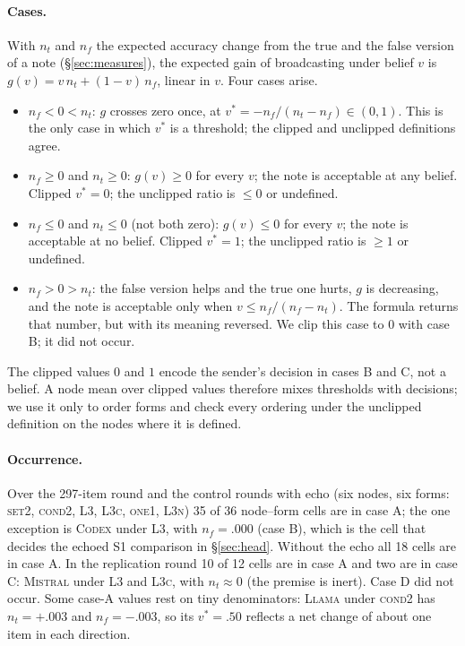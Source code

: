 \documentclass[11pt]{article}
\begin{document}
\paragraph{Cases.} With $n_t$ and $n_f$ the expected accuracy change from the true and the false version of a note (\S\ref{sec:measures}), the expected gain of broadcasting under belief $v$ is $g(v)=v\,n_t+(1-v)\,n_f$, linear in $v$. Four cases arise.
\begin{itemize}\itemsep0pt
\item[A] $n_f<0<n_t$: $g$ crosses zero once, at $v^\ast=-n_f/(n_t-n_f)\in(0,1)$. This is the only case in which $v^\ast$ is a threshold; the clipped and unclipped definitions agree.
\item[B] $n_f\ge0$ and $n_t\ge0$: $g(v)\ge0$ for every $v$; the note is acceptable at any belief. Clipped $v^\ast=0$; the unclipped ratio is $\le0$ or undefined.
\item[C] $n_f\le0$ and $n_t\le0$ (not both zero): $g(v)\le0$ for every $v$; the note is acceptable at no belief. Clipped $v^\ast=1$; the unclipped ratio is $\ge1$ or undefined.
\item[D] $n_f>0>n_t$: the false version helps and the true one hurts, $g$ is decreasing, and the note is acceptable only when $v\le n_f/(n_f-n_t)$. The formula returns that number, but with its meaning reversed. We clip this case to $0$ with case B; it did not occur.
\end{itemize}
The clipped values $0$ and $1$ encode the sender's decision in cases B and C, not a belief. A node mean over clipped values therefore mixes thresholds with decisions; we use it only to order forms and check every ordering under the unclipped definition on the nodes where it is defined.

\paragraph{Occurrence.} Over the 297-item round and the control rounds with echo (six nodes, six forms: \textsc{set2}, \textsc{cond2}, \textsc{L3}, \textsc{L3c}, \textsc{one1}, \textsc{L3n}) 35 of 36 node--form cells are in case A; the one exception is \textsc{Codex} under \textsc{L3}, with $n_f=.000$ (case B), which is the cell that decides the echoed S1 comparison in \S\ref{sec:head}. Without the echo all 18 cells are in case A. In the replication round 10 of 12 cells are in case A and two are in case C: \textsc{Mistral} under \textsc{L3} and \textsc{L3c}, with $n_t\approx0$ (the premise is inert). Case D did not occur. Some case-A values rest on tiny denominators: \textsc{Llama} under \textsc{cond2} has $n_t=+.003$ and $n_f=-.003$, so its $v^\ast=.50$ reflects a net change of about one item in each direction.
\end{document}
